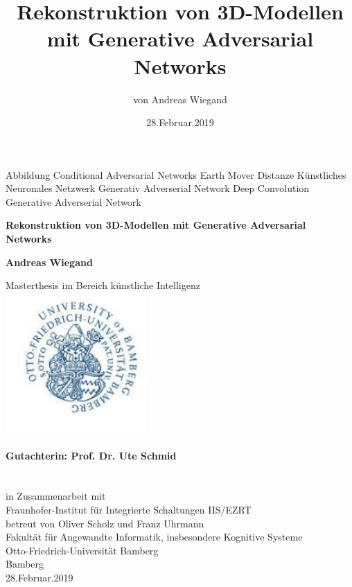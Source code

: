 \documentclass{llncs}
\begin{document}
\tableofcontents
\newpage
\begin{acronym}[Bash]
	 Abbildung
	Conditional Adversarial Networks
	 Earth Mover Distanze
	 Künstliches Neuronales Netzwerk
	 Generativ Adverserial Network
	Deep Convolution Generative Adverserial Network
	\end{acronym}
\begin{titlepage}
	\begin{center}
		\vspace{3cm}
		
		\textbf{\huge Rekonstruktion von 3D-Modellen mit Generative Adversarial Networks}

				
		\vspace{1.5cm}
		
		\textbf{Andreas Wiegand}
		
		
		
		Masterthesis im Bereich künstliche Intelligenz \\
		\vspace{1.5cm}
		\includegraphics[width=0.4\textwidth]{bamberg_logo.png}
		\vspace{1.5cm}~\\\\
		\textbf{Gutachterin: Prof. Dr. Ute Schmid\\ }
		\vspace{1.5cm}~\\\\
		in Zusammenarbeit mit\\
		Fraunhofer-Institut für Integrierte Schaltungen IIS/EZRT\\
		betreut von Oliver Scholz und Franz Uhrmann\\
		\vspace{0.8cm}
		Fakultät für Angewandte Informatik, insbesondere Kognitive Systeme\\
		Otto-Friedrich-Universität Bamberg\\
		Bamberg\\
		28.Februar.2019
		
	\end{center}
\end{titlepage}
\title{Rekonstruktion von 3D-Modellen mit Generative Adversarial Networks}
\author{von Andreas Wiegand}
\date{28.Februar.2019}
\maketitle
\end{document}
